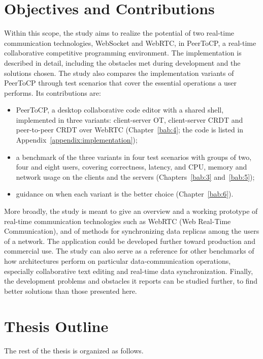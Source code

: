 \section{Objectives and Contributions}
\label{sec:tujuan}
\label{sec:manfaat}

Within this scope, the study aims to realize the potential of two real-time communication technologies, WebSocket and WebRTC, in PeerToCP, a real-time collaborative competitive programming environment. The implementation is described in detail, including the obstacles met during development and the solutions chosen. The study also compares the implementation variants of PeerToCP through test scenarios that cover the essential operations a user performs. Its contributions are:

\begin{itemize}
    \item PeerToCP, a desktop collaborative code editor with a shared shell, implemented in three variants: client-server OT, client-server CRDT and peer-to-peer CRDT over WebRTC (Chapter~\ref{bab:4}; the code is listed in Appendix~\ref{appendix:implementation});
    \item a benchmark of the three variants in four test scenarios with groups of two, four and eight users, covering correctness, latency, and CPU, memory and network usage on the clients and the servers (Chapters~\ref{bab:3} and~\ref{bab:5});
    \item guidance on when each variant is the better choice (Chapter~\ref{bab:6}).
\end{itemize}

More broadly, the study is meant to give an overview and a working prototype of real-time communication technologies such as WebRTC (Web Real-Time Communication), and of methods for synchronizing data replicas among the users of a network. The application could be developed further toward production and commercial use. The study can also serve as a reference for other benchmarks of how architectures perform on particular data-communication operations, especially collaborative text editing and real-time data synchronization. Finally, the development problems and obstacles it reports can be studied further, to find better solutions than those presented here.

\section{Thesis Outline}

The rest of the thesis is organized as follows.

